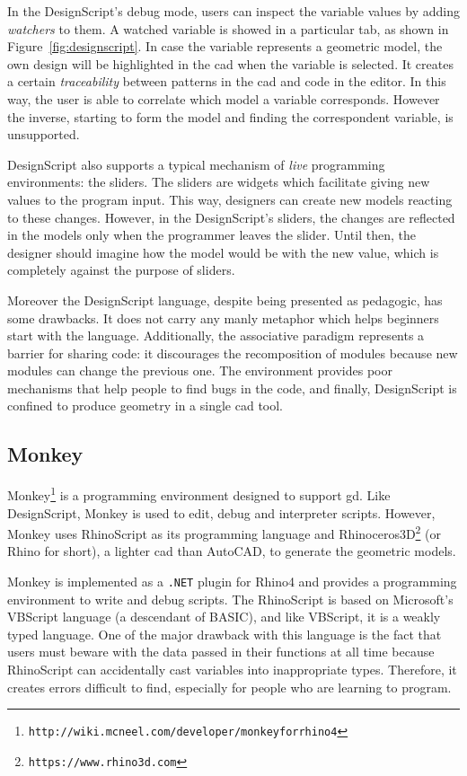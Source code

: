 In the DesignScript's debug mode, users can inspect the variable values by adding \textit{watchers} to them. A watched variable is showed in a particular tab, as shown in Figure~\ref{fig:designscript}. In case the variable represents a geometric model, the own design will be highlighted in the \gls{cad} when the variable is selected. It creates a certain \textit{traceability} between patterns in the \gls{cad} and code in the editor. In this way, the user is able to correlate which model a variable corresponds. However the inverse, starting to form the model and finding the correspondent variable, is unsupported.

DesignScript also supports a typical mechanism of \textit{live} programming environments: the sliders. The sliders are widgets which facilitate giving new values to the program input. This way, designers can create new models reacting to these changes. However, in the DesignScript's sliders, the changes are reflected in the models only when the programmer leaves the slider. Until then, the designer should imagine how the model would be with the new value, which is completely against the purpose of sliders.

Moreover the DesignScript language, despite being presented as pedagogic, has some drawbacks. It does not carry any manly metaphor which helps beginners start with the language. Additionally, the associative paradigm represents a barrier for sharing code: it discourages the recomposition of modules because new modules can change the previous one. The environment provides poor mechanisms that help people to find bugs in the code, and finally,  DesignScript is confined to produce geometry in a single \gls{cad} tool.
\subsection{Monkey} 
\label{subsec:monkey}
Monkey\footnote{\texttt{http://wiki.mcneel.com/developer/monkeyforrhino4}} is a programming environment designed to support \gls{gd}. Like DesignScript, Monkey is used to edit, debug and interpreter scripts. However, Monkey uses RhinoScript as its programming language and Rhinoceros3D\footnote{\label{fnote:rhin}\texttt{https://www.rhino3d.com}} (or Rhino for short), a lighter \gls{cad} than AutoCAD, to generate the geometric models.

Monkey is implemented as a \texttt{.NET} plugin for Rhino4 and provides a programming environment to write and debug scripts. The RhinoScript is based on Microsoft's VBScript language (a descendant of BASIC), and like VBScript, it is a weakly typed language. One of the major drawback with this language is the fact that users must beware with the data passed in their functions at all time because RhinoScript can accidentally cast variables into inappropriate types. Therefore, it creates errors difficult to find, especially for people who are learning to program.

